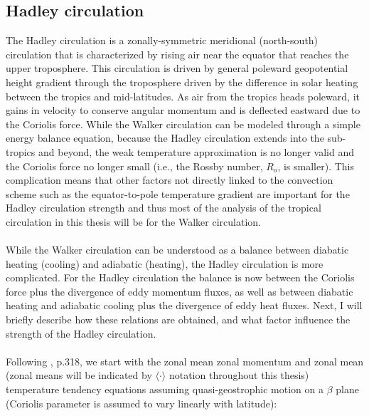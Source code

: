 \documentclass[letterpaper,12pt,titlepage,oneside,final]{book}
\begin{document}
\subsection{Hadley circulation}

The Hadley circulation is a zonally-symmetric meridional (north-south) circulation that is characterized by rising air near the equator that reaches the upper troposphere. This circulation is driven by general poleward geopotential height gradient through the troposphere driven by the difference in solar heating between the tropics and mid-latitudes. As air from the tropics heads poleward, it gains in velocity to conserve angular momentum and is deflected eastward due to the Coriolis force. While the Walker circulation can be modeled through a simple energy balance equation, because the Hadley circulation extends into the sub-tropics and beyond, the weak temperature approximation is no longer valid and the Coriolis force no longer small (i.e., the Rossby number, $R_{o}$, is smaller). This complication means that other factors not directly linked to the convection scheme such as the equator-to-pole temperature gradient are important for the Hadley circulation strength and thus most of the analysis of the tropical circulation in this thesis will be for the Walker circulation.
\\
\\
While the Walker circulation can be understood as a balance between diabatic heating (cooling) and adiabatic (heating), the Hadley circulation is more complicated. For the Hadley circulation the balance is now between the Coriolis force plus the divergence of eddy momentum fluxes, as well as between diabatic heating and adiabatic cooling plus the divergence of eddy heat fluxes. Next, I will briefly describe how these relations are obtained, and what factor influence the strength of the Hadley circulation. 
\\
\\
Following \citep{holton_introduction_2004}, p.318, we start with the zonal mean zonal momentum and zonal mean (zonal means will be indicated by $\langle \cdot \rangle$ notation throughout this thesis) temperature tendency equations assuming quasi-geostrophic motion on a $\beta$ plane (Coriolis parameter is assumed to vary linearly with latitude):
\end{document}
